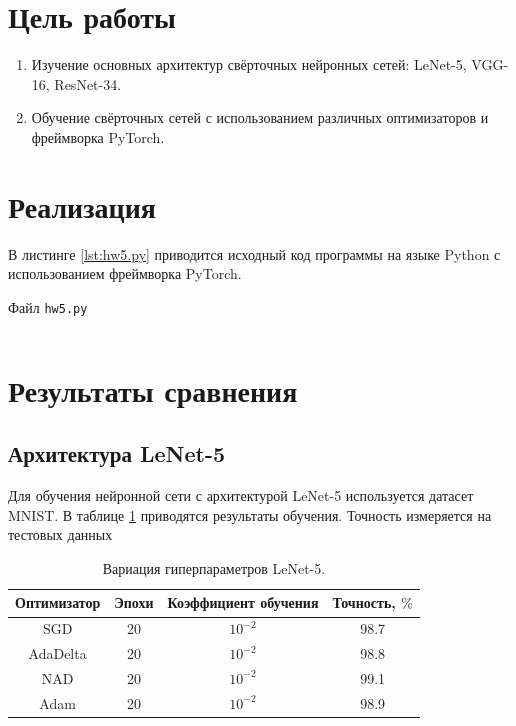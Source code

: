 \documentclass[a4paper, 14pt]{extarticle}
\newenvironment{longlisting}{\captionsetup{type=listing}}{}
\begin{document}
\renewcommand{\ttdefault}{pcr}

\setlength{\tabcolsep}{3pt}
\newpage
\setcounter{page}{2}

\section{Цель работы}

\begin{enumerate}
  \item Изучение основных архитектур свёрточных нейронных сетей: LeNet-5, VGG-16, ResNet-34.
  \item Обучение свёрточных сетей с использованием различных оптимизаторов и фреймворка PyTorch.
\end{enumerate}

\section{Реализация}

В листинге \ref{lst:hw5.py} приводится исходный код программы на языке Python с использованием фреймворка PyTorch.

\begin{longlisting}
  \caption{Файл \texttt{hw5.py}}
  \inputminted{py}{../sample/hw5.py}
  \label{lst:hw5.py}
\end{longlisting}

\section{Результаты сравнения}

\subsection{Архитектура LeNet-5}

Для обучения нейронной сети с архитектурой LeNet-5 используется датасет MNIST. В таблице \ref{table:lenet-5} приводятся результаты обучения. Точность
измеряется на тестовых данных

\begin{table}[h!]
\centering
\begin{tabular}{||c | c | c | c||}
 \hline
 Оптимизатор & Эпохи & Коэффициент обучения & Точность, $\%$ \\ [0.5ex] 
 \hline\hline
 SGD & 20 & $10^{-2}$ & 98.7 \\ 
 \hline
 AdaDelta & 20 & $10^{-2}$ & 98.8 \\
 \hline
 NAD & 20 & $10^{-2}$ & 99.1 \\
 \hline
 Adam & 20 & $10^{-2}$ & 98.9 \\ [1ex] 
 \hline
\end{tabular}
\caption{Вариация гиперпараметров LeNet-5.}
\label{table:lenet-5}
\end{table}
\end{document}
